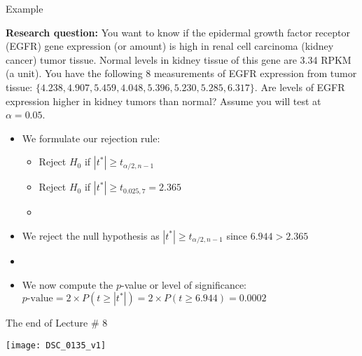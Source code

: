 \documentclass[xcolor=dvipsnames]{beamer}
\begin{document}
\begin{frame}{Example}

{\scriptsize  \textbf{Research question:} You want to know if the epidermal growth factor receptor (EGFR) gene expression (or amount) is high in renal cell carcinoma (kidney cancer) tumor tissue. Normal levels in kidney tissue of this gene are 3.34 RPKM (a unit). You have the following 8 measurements of EGFR expression from tumor tissue: $\{4.238, 4.907, 5.459, 4.048, 5.396, 5.230, 5.285, 6.317\}$. Are levels of EGFR expression higher in kidney tumors than normal? Assume you will test at $\alpha = 0.05$.}

\begin{itemize}
	\item We formulate our rejection rule:   \pause
	\begin{itemize}
		\item Reject $H_0$ if $|t^*| \geq t_{\alpha / 2, n-1}$  \pause
		\item Reject $H_0$ if $|t^*| \geq t_{0.025, 7} = 2.365$  \pause
		\item[] 
	\end{itemize}
	\item We reject the null hypothesis as $|t^*| \geq t_{\alpha / 2, n-1}$ since $6.944 > 2.365$  \pause
	\item[]
	\item We now compute the $p$-value or level of significance: $p\text{-value}=2 \times P(t \geq |t^*|) = 2\times P(t \geq 6.944) = 0.0002$
\end{itemize}
\end{frame}

\begin{frame}{The end of Lecture \# 8}
	\begin{center}
		\texttt{[image: DSC\_0135\_v1]}
	\end{center}
\end{frame}
\end{document}
